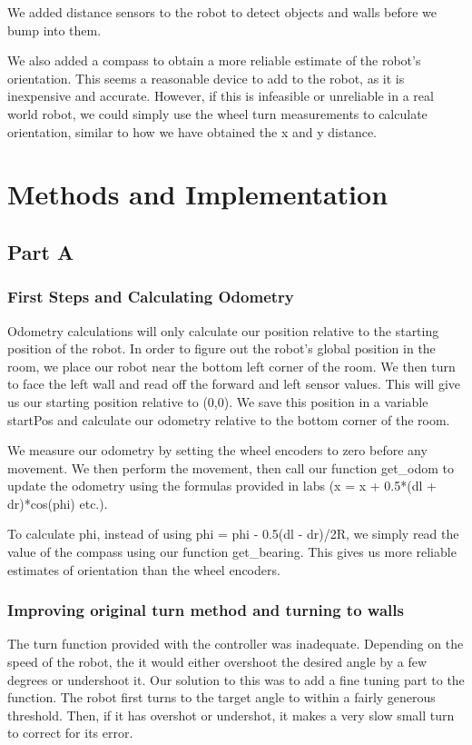 \documentclass[11pt, a4paper]{article}
\begin{document}
We added distance sensors to the robot to detect objects and walls before we bump into them. 

We also added a compass to obtain a more reliable estimate of the robot's orientation. This seems a reasonable device to add to the robot, as it is inexpensive and accurate. However, if this is infeasible or unreliable in a real world robot, we could simply use the wheel turn measurements to calculate orientation, similar to how we have obtained the x and y distance.

\section{Methods and Implementation}
\subsection{Part A}
\subsubsection*{First Steps and Calculating Odometry}

Odometry calculations will only calculate our position relative to the starting position of the robot. In order to figure out the robot's global position in the room, we place our robot near the bottom left corner of the room. We then turn to face the left wall and read off the forward and left sensor values. This will give us our starting position relative to (0,0). We save this position in a variable startPos and calculate our odometry relative to the bottom corner of the room.

We measure our odometry by setting the wheel encoders to zero before any movement. We then perform the movement, then call our function get\_odom to update the odometry using the formulas provided in labs (x = x + 0.5*(dl + dr)*cos(phi) etc.).

To calculate phi, instead of using phi = phi - 0.5(dl - dr)/2R, we simply read the value of the compass using our function get\_bearing. This gives us more reliable estimates of orientation than the wheel encoders.

\subsubsection*{Improving original turn method and turning to walls}
The turn function provided with the controller was inadequate. Depending on the speed of the robot, the it would either overshoot the desired angle by a few degrees or undershoot it. Our solution to this was to add a fine tuning part to the function. The robot first turns to the target angle to within a fairly generous threshold. Then, if it has overshot or undershot, it makes a very slow small turn to correct for its error.
\end{document}
